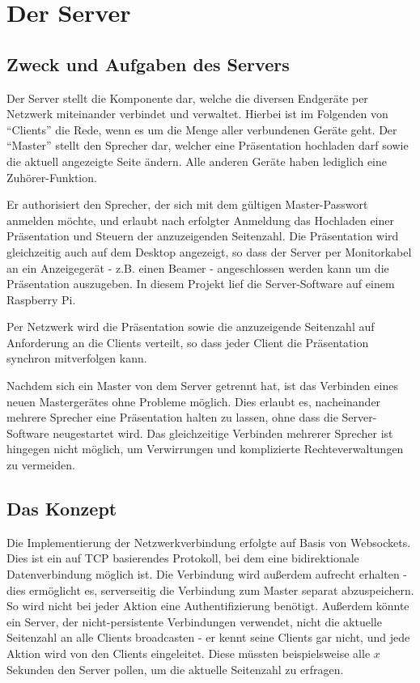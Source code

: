 \chapter[server]{Der Server}
\section{Zweck und Aufgaben des Servers}
Der Server stellt die Komponente dar, welche die diversen Endgeräte per Netzwerk miteinander verbindet und verwaltet. Hierbei ist im Folgenden von "`Clients"' die Rede, wenn es um die Menge aller verbundenen Geräte geht. Der "`Master"' stellt den Sprecher dar, welcher eine Präsentation hochladen darf sowie die aktuell angezeigte Seite ändern. Alle anderen Geräte haben lediglich eine Zuhörer-Funktion.

Er authorisiert den Sprecher, der sich mit dem gültigen Master-Passwort anmelden möchte, und erlaubt nach erfolgter Anmeldung das Hochladen einer Präsentation und Steuern der anzuzeigenden Seitenzahl. Die Präsentation wird gleichzeitig auch auf dem Desktop angezeigt, so dass der Server per Monitorkabel an ein Anzeigegerät - z.B. einen Beamer - angeschlossen werden kann um die Präsentation auszugeben. In diesem Projekt lief die Server-Software auf einem Raspberry Pi.

Per Netzwerk wird die Präsentation sowie die anzuzeigende Seitenzahl auf Anforderung an die Clients verteilt, so dass jeder Client die Präsentation synchron mitverfolgen kann.

Nachdem sich ein Master von dem Server getrennt hat, ist das Verbinden eines neuen Mastergerätes ohne Probleme möglich. Dies erlaubt es, nacheinander mehrere Sprecher eine Präsentation halten zu lassen, ohne dass die Server-Software neugestartet wird. Das gleichzeitige Verbinden mehrerer Sprecher ist hingegen nicht möglich, um Verwirrungen und komplizierte Rechteverwaltungen zu vermeiden.

\section{Das Konzept}
Die Implementierung der Netzwerkverbindung erfolgte auf Basis von Websockets. Dies ist ein auf TCP basierendes Protokoll, bei dem eine bidirektionale Datenverbindung möglich ist. Die Verbindung wird außerdem aufrecht erhalten - dies ermöglicht es, serverseitig die Verbindung zum Master separat abzuspeichern. So wird nicht bei jeder Aktion eine Authentifizierung benötigt. Außerdem könnte ein Server, der nicht-persistente Verbindungen verwendet, nicht die aktuelle Seitenzahl an alle Clients broadcasten - er kennt seine Clients gar nicht, und jede Aktion wird von den Clients eingeleitet. Diese müssten beispielsweise alle $x$ Sekunden den Server pollen, um die aktuelle Seitenzahl zu erfragen.

